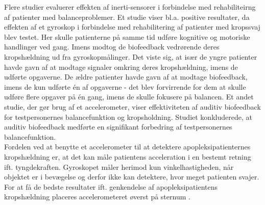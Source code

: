 \noindent Flere studier evaluerer effekten af inerti-sensorer i forbindelse med rehabiliteirng af patienter med balanceproblemer. Et studie viser bl.a. positive resultater, da effekten af et gyroskop i forbindelse med rehabilitering af patienter med kropssvaj blev testet. Her skulle patienterne på samme tid udføre kognitive og motoriske handlinger ved gang. Imens modtog de biofeedback vedrørende deres kropshældning ud fra gyroskopmålinger. Det viste sig, at især de yngre patienter havde gavn af at modtage signaler omkring deres kropshældning, imens de udførte opgaverne. De ældre patienter havde gavn af at modtage biofeedback, imens de kun udførte én af opgaverne - det blev forvirrende for dem at skulle udføre flere opgaver på én gang, imens de skulle fokusere på balancen. Et andet studie, der gør brug af et accelerometer, viser effektiviteten af auditiv biofeedback for testpersonernes balancefunktion og kropsholdning. Studiet konkluderede, at auditiv biofeedback  medførte en signifikant forbedring af testpersonernes balancefunktion. \cite{Giggins2013} \\
Fordelen ved at benytte et accelerometer til at detektere apopleksipatienternes kropshældning er, at det kan måle patientens acceleration i en bestemt retning ift. tyngdekraften. Gyroskopet måler herimod kun vinkelhastigheden, når objektet er i bevægelse og derfor ikke kan detektere, hvor meget patienten svajer. For at få de bedste resultater ift. genkendelse af apopleksipatientens kropshældning placeres accelerometeret øverst på sternum \cite{Gjoreski2011}. %

